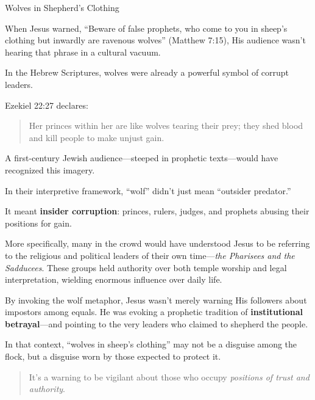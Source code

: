 \begin{HistoricalSidebar}{Wolves in Shepherd’s Clothing}

    When Jesus warned, “Beware of false prophets, who come to you in sheep’s clothing but inwardly are ravenous wolves” (Matthew 7:15), His audience wasn’t hearing that phrase in a cultural vacuum.
    
    \medskip
    
    In the Hebrew Scriptures, wolves were already a powerful symbol of corrupt leaders.
    
    \medskip
    
    Ezekiel 22:27 declares:
    
    \begin{quote}
    Her princes within her are like wolves tearing their prey; they shed blood and kill people to make unjust gain.
    \end{quote}
    
    A first-century Jewish audience—steeped in prophetic texts—would have recognized this imagery.
    
    \medskip
    
    In their interpretive framework, “wolf” didn’t just mean “outsider predator.”
    
    \medskip
    
    It meant \textbf{insider corruption}: princes, rulers, judges, and prophets abusing their positions for gain.
    
    \medskip
    
    More specifically, many in the crowd would have understood Jesus to be referring to the religious and political leaders of their own time—\textit{the Pharisees and the Sadducees}. These groups held authority over both temple worship and legal interpretation, wielding enormous influence over daily life.
    
    \medskip
    
    By invoking the wolf metaphor, Jesus wasn’t merely warning His followers about impostors among equals. He was evoking a prophetic tradition of \textbf{institutional betrayal}—and pointing to the very leaders who claimed to shepherd the people.
    
    \medskip
    
    In that context, “wolves in sheep’s clothing” may not be a disguise among the flock, but a disguise worn by those expected to protect it.
    

    \begin{quote}
    It’s a warning to be vigilant about those who occupy \textit{positions of trust and authority}.
    \end{quote}
    

\end{HistoricalSidebar}
